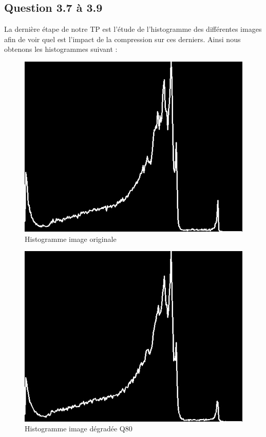 \documentclass[12pt]{report}
\begin{document}
\newpage
\subsection{Question 3.7 à 3.9}

La dernière étape de notre TP est l'étude de l'histogramme des différentes images afin de voir quel est l'impact de la compression sur ces derniers. Ainsi nous obtenons les histogrammes suivant :

\begin{figure}[H]
\begin{center}
\includegraphics[scale=0.5]{../ImageRes/hist_0.jpg} 
\caption{Histogramme image originale}
\end{center}
\end{figure}

\begin{figure}[H]
\begin{center}
\includegraphics[scale=0.5]{../ImageRes/hist_1.jpg} 
\caption{Histogramme image dégradée Q80 }
\end{center}
\end{figure}
\end{document}
